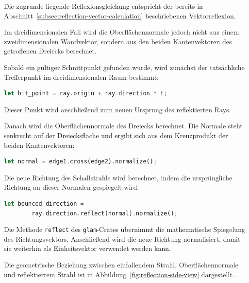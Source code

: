 \documentclass{article}
\begin{document}
    Die zugrunde liegende Reflexionsgleichung entspricht der bereits in
    Abschnitt~\ref{subsec:reflection-vector-calculation} beschriebenen
    Vektorreflexion.

    Im dreidimensionalen Fall wird die Oberflächennormale jedoch nicht aus einem
    zweidimensionalen Wandvektor, sondern aus den beiden Kantenvektoren des
    getroffenen Dreiecks berechnet.

    Sobald ein gültiger Schnittpunkt gefunden wurde, wird zunächst der tatsächliche
    Trefferpunkt im dreidimensionalen Raum bestimmt:

    \begin{lstlisting}[language=Rust]
    let hit_point = ray.origin + ray.direction * t;
    \end{lstlisting}

    Dieser Punkt wird anschließend zum neuen Ursprung des reflektierten Rays.

    Danach wird die Oberflächennormale des Dreiecks berechnet. Die Normale steht
    senkrecht auf der Dreiecksfläche und ergibt sich aus dem Kreuzprodukt der
    beiden Kantenvektoren:

    \begin{lstlisting}[language=Rust]
    let normal = edge1.cross(edge2).normalize();
    \end{lstlisting}

    Die neue Richtung des Schallstrahls wird berechnet, indem die ursprüngliche
    Richtung an dieser Normalen gespiegelt wird:

    \begin{lstlisting}[language=Rust]
    let bounced_direction =
        ray.direction.reflect(normal).normalize();
    \end{lstlisting}

    Die Methode \texttt{reflect} des \texttt{glam}-Crates übernimmt die
    mathematische Spiegelung des Richtungsvektors. Anschließend wird die neue
    Richtung normalisiert, damit sie weiterhin als Einheitsvektor verwendet werden
    kann.

    Die geometrische Beziehung zwischen einfallendem Strahl,
    Oberflächennormale und reflektiertem Strahl ist in
    Abbildung~\ref{fig:reflection-side-view} dargestellt.
\end{document}
